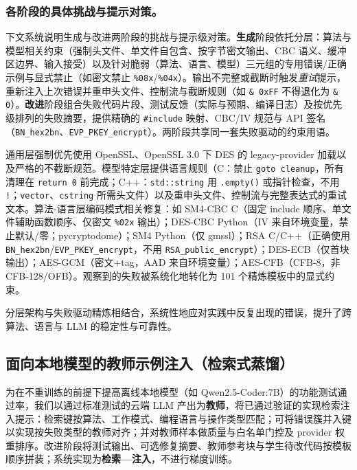 \documentclass[12pt]{llncs}
\begin{document}
\subsubsection{各阶段的具体挑战与提示对策。}
\label{subsec:challenges_prompt_table}
下文系统说明生成与改进两阶段的挑战与提示级对策。\textbf{生成}阶段依托分层：算法与模型相关约束（强制头文件、单文件自包含、按字节密文输出、CBC 语义、缓冲区边界、输入接受）以及针对脆弱（算法、语言、模型）三元组的专用错误/正确示例与显式禁止（如密文禁止 \texttt{\%08x}/\texttt{\%04x}）。输出不完整或截断时触发\emph{重试}提示，重新注入上次错误并重申头文件、控制流与截断规则（如 \texttt{\& 0xFF} 不得退化为 \texttt{\& 0}）。\textbf{改进}阶段组合失败代码片段、测试反馈（实际与预期、编译日志）及按优先级排列的失败摘要，提供精确的 \texttt{\#include} 映射、CBC/IV 规范与 API 签名（\texttt{BN\_hex2bn}、\texttt{EVP\_PKEY\_encrypt}）。两阶段共享同一套失败驱动的约束用语。

通用层强制优先使用 OpenSSL、OpenSSL 3.0 下 DES 的 legacy-provider 加载以及严格的不截断规范。模型特定层提供语言规则（C：禁止 \texttt{goto cleanup}，所有清理在 \texttt{return 0} 前完成；C++：\texttt{std::string} 用 \texttt{.empty()} 或指针检查，不用 \texttt{!}；\texttt{vector}、\texttt{cstring} 所需头文件）以及重申头文件、控制流与完整表达式的重试文本。算法-语言层编码模式相关修复：如 SM4-CBC C（固定 include 顺序、单文件辅助函数顺序、仅密文 \texttt{\%02x} 输出）；DES-CBC Python（IV 来自环境变量，禁止默认/零；pycryptodome）；SM4 Python（仅 gmssl）；RSA C/C++（正确使用 \texttt{BN\_hex2bn}/\texttt{EVP\_PKEY\_encrypt}，不用 \texttt{RSA\_public\_encrypt}）；DES-ECB（仅首块输出）；AES-GCM（密文+tag，AAD 来自环境变量）；AES-CFB（CFB-8，非 CFB-128/OFB）。观察到的失败被系统化地转化为 101 个精炼模板中的显式约束。

分层架构与失败驱动精炼相结合，系统性地应对实践中反复出现的错误，提升了跨算法、语言与 LLM 的稳定性与可靠性。

\subsection{面向本地模型的教师示例注入（检索式蒸馏）}
\label{subsec:distillation}
为在不重训练的前提下提高离线本地模型（如 Qwen2.5-Coder:7B）的功能测试通过率，我们以通过标准测试的云端 LLM 产出为\textbf{教师}，将已通过验证的实现检索注入提示：检索键按算法、工作模式、编程语言与操作类型匹配；可将错误簇并入键以实现按失败类型的教师对齐；并对教师样本做质量与白名单门控及 provider 权重排序。改进阶段将测试输出、可选修复摘要、教师参考块与学生待改代码按模板顺序拼装；系统实现为\textbf{检索—注入}，不进行梯度训练。
\end{document}
